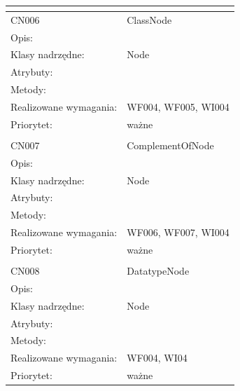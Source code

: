 \documentclass[a4paper,10pt]{article}
\begin{document}
\begin{center}
\begin{longtable}{|m{3cm}|m{9cm}|}
\multicolumn{2}{c}{} \\
 \hline

CN006 & ClassNode \\ \hline
Opis: &     \\ \hline
Klasy nadrzędne: & Node     \\ \hline
Atrybuty: & %
 \\ \hline
Metody: & %
  \\ \hline
Realizowane wymagania: & WF004, WF005, WI004 \\ \hline
Priorytet: & ważne  \\ \hline

\multicolumn{2}{c}{} \\
 \hline

CN007 & ComplementOfNode \\ \hline
Opis: &     \\ \hline
Klasy nadrzędne: & Node     \\ \hline
Atrybuty: & %
 \\ \hline
Metody: & %
  \\ \hline
Realizowane wymagania: & WF006, WF007, WI004 \\ \hline
Priorytet: & ważne  \\ \hline

\multicolumn{2}{c}{} \\
 \hline

CN008 & DatatypeNode \\ \hline
Opis: &     \\ \hline
Klasy nadrzędne: & Node     \\ \hline
Atrybuty: & %
 \\ \hline
Metody: & %
  \\ \hline
Realizowane wymagania: & WF004, WI04 \\ \hline
Priorytet: & ważne  \\ \hline


\end{longtable}
\end{center}
\end{document}
